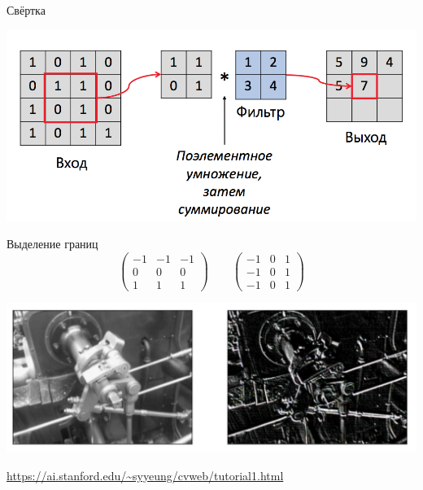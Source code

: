\documentclass[notes,12pt, aspectratio=169]{beamer}
\begin{document}
\begin{frame}{Свёртка}
\begin{center}
	\includegraphics[width=.8\linewidth]{cconv_2.png}
\end{center}
\end{frame}


{
	\begin{frame}
\end{frame}
}

\begin{frame}{Выделение границ} 
\[ 
\begin{pmatrix}
-1 & -1 & -1  \\
0 & 0 & 0 \\         
1 & 1 & 1 
\end{pmatrix}  \qquad 
\begin{pmatrix}
-1 & 0 & 1  \\
-1 & 0 & 1 \\         
-1 & 0 & 1 
\end{pmatrix} 
\]

\begin{center}
	\includegraphics[width=.7\linewidth]{cconv_3.png}
\end{center}

\vfill %
\footnotesize
{\color{blue} \url{https://ai.stanford.edu/~syyeung/cvweb/tutorial1.html}}
\end{frame}
\end{document}
